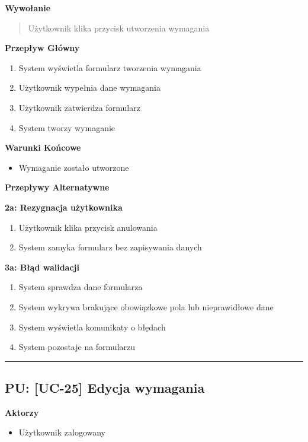 \vspace{0.2cm}
\noindent\textbf{Wywołanie}
\begin{quote}
    Użytkownik klika przycisk utworzenia wymagania
\end{quote}

\vspace{0.2cm}
\noindent\textbf{Przepływ Główny}
\begin{enumerate}
    \item System wyświetla formularz tworzenia wymagania
    \item Użytkownik wypełnia dane wymagania
    \item Użytkownik zatwierdza formularz
    \item System tworzy wymaganie
\end{enumerate}

\vspace{0.2cm}
\noindent\textbf{Warunki Końcowe}
\begin{itemize}
    \item Wymaganie zostało utworzone
\end{itemize}

\vspace{0.2cm}
\noindent\textbf{Przepływy Alternatywne}

\textbf{2a: Rezygnacja użytkownika}
\begin{enumerate}
    \item Użytkownik klika przycisk anulowania
    \item System zamyka formularz bez zapisywania danych
\end{enumerate}

\textbf{3a: Błąd walidacji}
\begin{enumerate}
    \item System sprawdza dane formularza
    \item System wykrywa brakujące obowiązkowe pola lub nieprawidłowe dane
    \item System wyświetla komunikaty o błędach
    \item System pozostaje na formularzu
\end{enumerate}


\hrule
\vspace{1cm}

\subsection*{PU: [UC-25] Edycja wymagania}

\noindent\textbf{Aktorzy}
\begin{itemize}
    \item Użytkownik zalogowany
\end{itemize}

